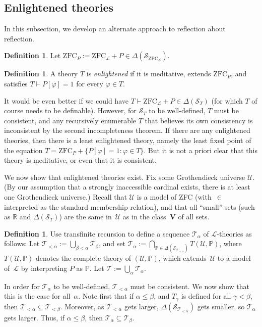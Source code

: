 \documentclass[12pt]{article}
\newcommand{\PP}{\mathbb{P}}
\newcommand{\vp}{\varphi}
\newcommand{\RR}{\mathbb{R}}
\newcommand{\zfc}{\mathrm{ZFC}}
\newcommand{\zfcl}{{\zfc_\cL}}
\newcommand{\zfcp}{{\zfc_P}}
\newcommand{\cL}{\mathcal{L}}
\newcommand{\cS}{\mathcal{S}}
\newcommand{\cT}{\mathcal{T}}
\newcommand{\cU}{\mathcal{U}}
\theoremstyle{plain}
\theoremstyle{definition}
\newtheorem{definition}[theorem]{Definition}
\theoremstyle{remark}
\begin{document}
\subsection{Enlightened theories}
In this subsection, we develop an alternate approach to reflection about reflection.
\begin{definition}
Let $\zfcp := \zfcl + P\in\Delta(\cS_\zfcl)$.
\end{definition}
\begin{definition}
A theory $T$ is \emph{enlightened} if it is meditative, extends $\zfcp$, and satisfies $T\vdash P[\vp] = 1$ for every $\vp\in T$.
\end{definition}
It would be even better if we could have $T\vdash\zfcl + P\in\Delta(\cS_T)$ (for which $T$ of course needs to be definable). However, for $\cS_T$ to be well-defined, $T$ must be consistent, and any recursively enumerable $T$ that believes its own consistency is inconsistent by the second incompleteness theorem.
If there are any enlightened theories, then there is a least enlightened theory, namely the least fixed point of the equation $T = \zfcp + \{P[\vp] = 1 : \vp\in T\}$. But it is not a priori clear that this theory is meditative, or even that it is consistent. 

We now show that enlightened theories exist.
Fix some Grothendieck universe $\cU$. (By our assumption that a strongly inaccessible cardinal exists, there is at least one Grothendieck universe.) Recall that $\cU$ is a model of ZFC (with~$\in$ interpreted as the standard membership relation), and that all ``small'' sets (such as $\RR$ and $\Delta(\cS_T)$) are the same in~$\cU$ as in the class~$\mathbf{V}$ of all sets.
\begin{definition}
Use transfinite recursion to define a sequence $\cT_\alpha$ of $\cL$-theories as follows: Let $\cT_{<\alpha} := \bigcup_{\beta<\alpha} \cT_\beta$, and set $\cT_\alpha := \bigcap_{\PP\in\Delta(\cS_{\cT_{<\alpha}})} T(\cU,\PP)$, where $T(\cU,\PP)$ denotes the complete theory of $(\cU,\PP)$, which extends~$\cU$ to a model of~$\cL$ by interpreting $P$ as $\PP$.
Let $\cT := \bigcup_\alpha \cT_\alpha$.
\end{definition}
In order for $\cT_\alpha$ to be well-defined, $\cT_{<\alpha}$ must be consistent. We now show that this is the case for all~$\alpha$.
Note first that if $\alpha\le\beta$, and $T_\gamma$ is defined for all $\gamma<\beta$, then $\cT_{<\alpha}\subseteq\cT_{<\beta}$. Moreover, as $\cT_{<\alpha}$ gets larger, $\Delta(\cS_{\cT_{<\alpha}})$ gets smaller, so $\cT_\alpha$ gets larger. Thus, if $\alpha\le\beta$, then $\cT_\alpha\subseteq\cT_\beta$.
\end{document}
